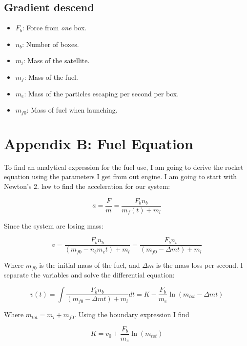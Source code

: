 \documentclass[a4paper, 10pt]{article}
\begin{document}
\subsection{Gradient descend}\label{sec:gradient}

 
\begin{itemize}
\item $F_b$: Force from \textit{one} box.
\item $n_b$: Number of boxes.
\item $m_l$: Mass of the satellite.
\item $m_f$: Mass of the fuel.
\item $m_e$: Mass of the particles escaping per second per box.
\item $m_{f0}$: Mass of fuel when launching.
\end{itemize}

\section{Appendix B: Fuel Equation}\label{sec:Fuel}

To find an analytical expression for the fuel use, I am going to derive the rocket equation using the parameters I get from out engine. I am going to start with Newton's 2. law to find the acceleration for our system:

\begin{equation}
a = \frac{F}{m} = \frac{F_b n_b}{m_f(t) + m_l} 
\end{equation}

Since the system are losing mass:

\begin{equation}
a = \frac{F_b n_b}{(m_{f0} - n_b m_e t) + m_l} = \frac{F_b n_b}{(m_{f0} - \Delta m t) + m_l}
\end{equation} 

Where $m_{f0}$ is the initial mass of the fuel, and $\Delta m$ is the mass loss per second. I separate the variables and solve the differential equation:

\begin{equation}
v(t) = \int \frac{F_b n_b}{(m_{f0} - \Delta m t) + m_l} dt
= K - \frac{F_b}{m_e} \ln(m_{tot} - \Delta m t) 
\end{equation}

Where $m_{tot} = m_l + m_{f0}$. Using the boundary expression I find

\begin{equation}
K = v_0 + \frac{F_b}{m_e} \ln (m_{tot})
\end{equation}
\end{document}
